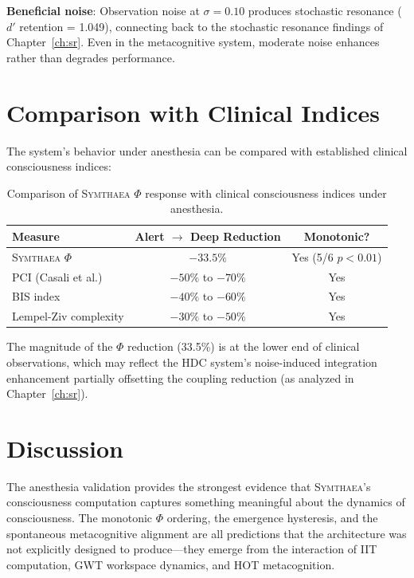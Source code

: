 \documentclass[12pt]{book}
\newcommand{\symthaea}{\textsc{Symthaea}}
\begin{document}
\textbf{Beneficial noise}: Observation noise at $\sigma = 0.10$ produces stochastic resonance ($d'$ retention = 1.049), connecting back to the stochastic resonance findings of Chapter~\ref{ch:sr}. Even in the metacognitive system, moderate noise enhances rather than degrades performance.

\section{Comparison with Clinical Indices}

The system's behavior under anesthesia can be compared with established clinical consciousness indices:

\begin{table}[H]
\centering
\caption{Comparison of \symthaea{} $\Phi$ response with clinical consciousness indices under anesthesia.}
\label{tab:clinical-comparison}
\begin{tabular}{lcc}
\toprule
\textbf{Measure} & \textbf{Alert $\to$ Deep Reduction} & \textbf{Monotonic?} \\
\midrule
\symthaea{} $\Phi$ & $-33.5\%$ & Yes (5/6 $p < 0.01$) \\
PCI (Casali et al.) & $-50\%$ to $-70\%$ & Yes \\
BIS index & $-40\%$ to $-60\%$ & Yes \\
Lempel-Ziv complexity & $-30\%$ to $-50\%$ & Yes \\
\bottomrule
\end{tabular}
\end{table}

The magnitude of the $\Phi$ reduction (33.5\%) is at the lower end of clinical observations, which may reflect the HDC system's noise-induced integration enhancement partially offsetting the coupling reduction (as analyzed in Chapter~\ref{ch:sr}).

\section{Discussion}

The anesthesia validation provides the strongest evidence that \symthaea{}'s consciousness computation captures something meaningful about the dynamics of consciousness. The monotonic $\Phi$ ordering, the emergence hysteresis, and the spontaneous metacognitive alignment are all predictions that the architecture was not explicitly designed to produce---they emerge from the interaction of IIT computation, GWT workspace dynamics, and HOT metacognition.
\end{document}
